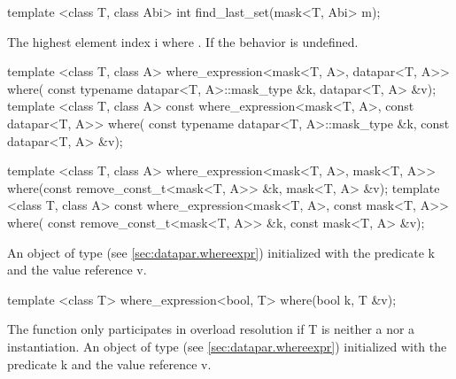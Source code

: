 \begin{itemdecl}
template <class T, class Abi> int find_last_set(mask<T, Abi> m);
\end{itemdecl}
\begin{itemdescr}
  \pnum\returns The highest element index \code i where .
  \pnum\remarks If  the behavior is undefined.
\end{itemdescr}

\begin{itemdecl}
template <class T, class A>
where_expression<mask<T, A>, datapar<T, A>> where(
    const typename datapar<T, A>::mask_type &k, datapar<T, A> &v);
template <class T, class A>
const where_expression<mask<T, A>, const datapar<T, A>> where(
    const typename datapar<T, A>::mask_type &k, const datapar<T, A> &v);

template <class T, class A>
where_expression<mask<T, A>, mask<T, A>> where(const remove_const_t<mask<T, A>> &k,
                                               mask<T, A> &v);
template <class T, class A>
const where_expression<mask<T, A>, const mask<T, A>> where(
    const remove_const_t<mask<T, A>> &k, const mask<T, A> &v);
\end{itemdecl}
\begin{itemdescr}
  \pnum\returns An object of type  (see \ref{sec:datapar.whereexpr}) initialized with the predicate \code k and the value reference \code v.
\end{itemdescr}

\begin{itemdecl}
template <class T> where_expression<bool, T> where(bool k, T &v);
\end{itemdecl}
\begin{itemdescr}
  \pnum\remarks The function only participates in overload resolution if \type T is neither a \datapar nor a \mask instantiation.
  \pnum\returns An object of type  (see \ref{sec:datapar.whereexpr}) initialized with the predicate \code k and the value reference \code v.
\end{itemdescr}

